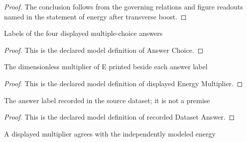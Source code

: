 \begin{proof}
  The conclusion follows from the governing relations and figure readouts named in the statement of energy after transverse boost.
\end{proof}
\begin{definition}
  \label{def:physics:phyx-mini-0560:phyxminiproblems-problemphyxmini0560-answerchoice}
  Labels of the four displayed multiple-choice answers
\end{definition}
\begin{proof}
  This is the declared model definition of Answer Choice.
\end{proof}
\begin{definition}
  \label{def:physics:phyx-mini-0560:phyxminiproblems-problemphyxmini0560-displayedenergymultiplier}
  The dimensionless multiplier of E printed beside each answer label
\end{definition}
\begin{proof}
  This is the declared model definition of displayed Energy Multiplier.
\end{proof}
\begin{definition}
  \label{def:physics:phyx-mini-0560:phyxminiproblems-problemphyxmini0560-recordeddatasetanswer}
  The answer label recorded in the source dataset; it is not a premise
\end{definition}
\begin{proof}
  This is the declared model definition of recorded Dataset Answer.
\end{proof}
\begin{definition}
  \label{def:physics:phyx-mini-0560:phyxminiproblems-problemphyxmini0560-matchesdisplayedanswer}
  A displayed multiplier agrees with the independently modeled energy
\end{definition}

